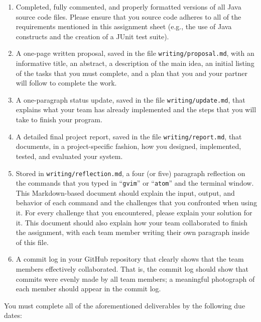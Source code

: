 \documentclass[11pt]{article}
\newcommand{\reflection}{\lstinline{writing/reflection.md}}
\newcommand{\command}[1]{``\lstinline{#1}''}
\newcommand{\program}[1]{\lstinline{#1}}
\begin{document}
\begin{enumerate}

  \setlength{\itemsep}{0in}

\item Completed, fully commented, and properly formatted versions of all Java
  source code files. Please ensure that you source code adheres to all of the
  requirements mentioned in this assignment sheet (e.g., the use of Java
  constructs and the creation of a JUnit test suite).

\item A one-page written proposal, saved in the file
  \program{writing/proposal.md}, with an informative title, an abstract, a
  description of the main idea, an initial listing of the tasks that you must
  complete, and a plan that you and your partner will follow to complete the
  work.

\item A one-paragraph status update, saved in the file
  \program{writing/update.md}, that explains what your team has already
  implemented and the steps that you will take to finish your program.

\item A detailed final project report, saved in the file
  \program{writing/report.md}, that documents, in a project-specific fashion,
  how you designed, implemented, tested, and evaluated your system.

\item Stored in \reflection{}, a four (or five) paragraph reflection on the
  commands that you typed in \command{gvim} or \command{atom} and the terminal
  window. This Markdown-based document should explain the input, output, and
  behavior of each command and the challenges that you confronted when using it.
  For every challenge that you encountered, please explain your solution for it.
  This document should also explain how your team collaborated to finish the
  assignment, with each team member writing their own paragraph inside of this
  file.

\item A commit log in your GitHub repository that clearly shows that the team
  members effectively collaborated. That is, the commit log should show that
  commits were evenly made by all team members; a meaningful photograph of each
  member should appear in the commit log.

\end{enumerate}

\noindent
You must complete all of the aforementioned deliverables by the following due dates:
\end{document}
